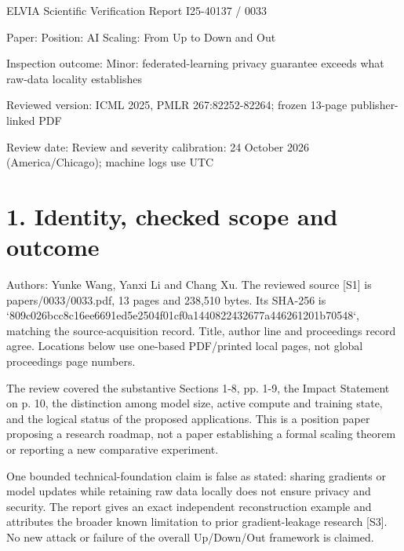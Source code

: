 \documentclass[10pt]{article}
\begin{document}
ELVIA Scientific Verification Report
I25-40137 / 0033\par
Paper: Position: AI Scaling: From Up to Down and Out\par
Inspection outcome: Minor: federated-learning privacy guarantee exceeds what raw-data locality establishes\par
Reviewed version: ICML 2025, PMLR 267:82252-82264; frozen 13-page publisher-linked PDF\par
Review date: Review and severity calibration: 24 October 2026 (America/Chicago); machine logs use UTC\par
\section*{1. Identity, checked scope and outcome}
Authors: Yunke Wang, Yanxi Li and Chang Xu. The reviewed source [S1] is papers/0033/0033.pdf, 13 pages and 238,510 bytes. Its SHA-256 is `809c026bcc8c16ee6691ed5e2504f01cf0a1440822432677a446261201b70548`, matching the source-acquisition record. Title, author line and proceedings record agree. Locations below use one-based PDF/printed local pages, not global proceedings page numbers.\par
The review covered the substantive Sections 1-8, pp. 1-9, the Impact Statement on p. 10, the distinction among model size, active compute and training state, and the logical status of the proposed applications. This is a position paper proposing a research roadmap, not a paper establishing a formal scaling theorem or reporting a new comparative experiment.\par
One bounded technical-foundation claim is false as stated: sharing gradients or model updates while retaining raw data locally does not ensure privacy and security. The report gives an exact independent reconstruction example and attributes the broader known limitation to prior gradient-leakage research [S3]. No new attack or failure of the overall Up/Down/Out framework is claimed.\par
\end{document}
